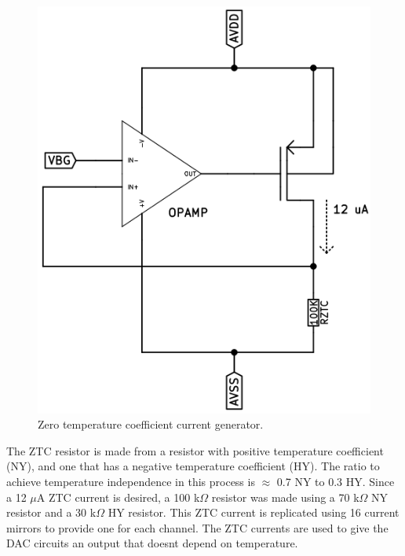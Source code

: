 \documentclass[12pt,oneside,final]{siuethesis}
\theoremstyle{definition}
\begin{document}
\begin{figure}[htbp!]
\centering
\includegraphics[scale=.45,keepaspectratio=true]{images/ztc_gen.png} 
\caption{Zero temperature coefficient current generator.}
\label{fig:ztc}
\end{figure}
\par The ZTC resistor is made from a resistor with positive temperature coefficient (NY), and one that has a negative temperature coefficient (HY). The ratio to achieve temperature independence in this process is $\approx$ 0.7 NY to 0.3 HY. Since a 12 $\mu$A ZTC current is desired, a 100 k$\Omega$ resistor was made using a 70 k$\Omega$ NY resistor and a 30 k$\Omega$ HY resistor. This ZTC current is replicated using 16 current mirrors to provide one for each channel. The ZTC currents are used to give the DAC circuits an output that doesnt depend on temperature. 
\end{document}
